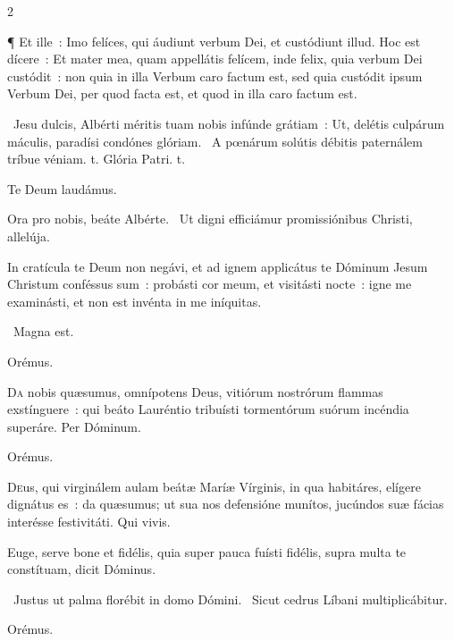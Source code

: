 \documentclass[9pt,twoside]{extarticle}
\begin{document}
\begin{multicols}{2}
{{¶ Et ille~: Imo felíces, qui áudiunt verbum Dei, et custódiunt illud. Hoc est dícere~: Et mater mea, quam appellátis felícem, inde felix, quia verbum Dei custódit~: non quia in illa Verbum caro factum est, sed quia custódit ipsum Verbum Dei, per quod facta est, et quod in illa caro factum est.

\begin{tightlist}{}
\item {}~Jesu dulcis, Albérti méritis tuam nobis infúnde grátiam~: \textred{*} Ut, delétis culpárum máculis, paradísi condónes glóriam.
~A pœnárum solútis débitis paternálem tríbue véniam. t. Glória Patri. t.
\item Te Deum laudámus.
\item {} Ora pro nobis, beáte Albérte. ~Ut digni efficiámur promissiónibus Christi, allelúja.
\item {} In cratícula te Deum non negávi, et ad ignem applicátus te Dóminum Jesum Christum conféssus sum~: probásti cor meum, et visitásti nocte~: igne me examinásti, et non est invénta in me iníquitas.
\item {}~Magna est.
\item Orémus. \hfill {}
\end{tightlist}

\lettrine{D}a nobis quæsumus, omnípotens Deus, vitiórum nostrórum flammas exstínguere~: qui beáto Lauréntio tribuísti tormentórum suórum incéndia superáre. Per Dóminum.

\begin{tightlist}{}
\item {}
\item Orémus. \hfill {}
\end{tightlist}

\lettrine{D}eus, qui virginálem aulam beátæ Maríæ Vírginis, in qua habitáres, elígere dignátus es~: da quæsumus; ut sua nos defensióne munítos, jucúndos suæ fácias interésse festivitáti. Qui vivis.

\begin{tightlist}{}
\item {} Euge, serve bone et fidélis, quia super pauca fuísti fidélis, supra multa te constítuam, dicit Dóminus.
\item {}~Justus ut palma florébit in domo Dómini. ~Sicut cedrus Líbani multiplicábitur.
\item Orémus. \hfill {}
\end{tightlist}

}}
\end{multicols}
\end{document}
